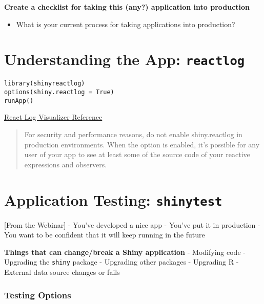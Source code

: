 \documentclass[]{book}
\providecommand{\tightlist}{%
  \setlength{\itemsep}{0pt}\setlength{\parskip}{0pt}}
\begin{document}
\textbf{Create a checklist for taking this (any?) application into
production}

\begin{itemize}
\tightlist
\item
  What is your current process for taking applications into production?
\end{itemize}

\hypertarget{understanding-the-app-reactlog}{%
\chapter{\texorpdfstring{Understanding the App:
\texttt{reactlog}}{Understanding the App: reactlog}}\label{understanding-the-app-reactlog}}

\begin{verbatim}
library(shinyreactlog)
options(shiny.reactlog = True)
runApp()
\end{verbatim}

\href{https://shiny.rstudio.com/reference/shiny/0.14/showReactLog.html}{React
Log Visualizer Reference}

\begin{quote}
For security and performance reasons, do not enable shiny.reactlog in
production environments. When the option is enabled, it's possible for
any user of your app to see at least some of the source code of your
reactive expressions and observers.
\end{quote}

\hypertarget{application-testing-shinytest}{%
\chapter{\texorpdfstring{Application Testing:
\texttt{shinytest}}{Application Testing: shinytest}}\label{application-testing-shinytest}}

{[}From the Webinar{]} - You've developed a nice app - You've put it in
production - You want to be confident that it will keep running in the
future

\textbf{Things that can change/break a Shiny application} - Modifying
code - Upgrading the \texttt{shiny} package - Upgrading other packages -
Upgrading R - External data source changes or fails

\hypertarget{testing-options}{%
\subsection{Testing Options}\label{testing-options}}
\end{document}

